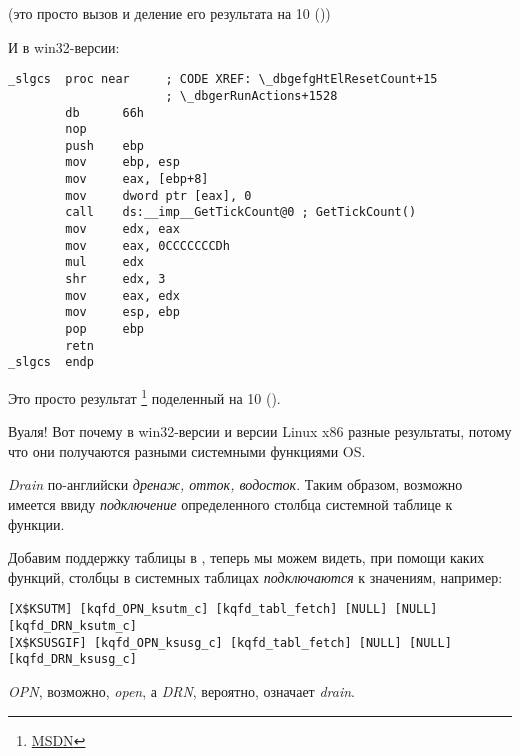 (это просто вызов  и деление его результата на 10 ())

И в win32-версии:

\begin{lstlisting}[style=customasmx86]
_slgcs  proc near     ; CODE XREF: \_dbgefgHtElResetCount+15
                      ; \_dbgerRunActions+1528
        db      66h
        nop
        push    ebp
        mov     ebp, esp
        mov     eax, [ebp+8]
        mov     dword ptr [eax], 0
        call    ds:__imp__GetTickCount@0 ; GetTickCount()
        mov     edx, eax
        mov     eax, 0CCCCCCCDh
        mul     edx
        shr     edx, 3
        mov     eax, edx
        mov     esp, ebp
        pop     ebp
        retn
_slgcs  endp
\end{lstlisting}

Это просто результат 
\footnote{\href{http://go.yurichev.com/17248}{MSDN}}
поделенный на 10 ().

Вуаля! Вот почему в win32-версии и версии Linux x86 разные результаты, потому что они получаются разными 
системными функциями \ac{OS}.

\emph{Drain} по-английски \emph{дренаж, отток, водосток}. Таким образом, возможно имеется ввиду \emph{подключение} 
определенного столбца системной таблице к функции.

Добавим поддержку таблицы  в \oracletables, 
теперь мы можем видеть, при помощи каких функций, столбцы в системных таблицах \emph{подключаются} к значениям, 
например:

\begin{lstlisting}
[X$KSUTM] [kqfd_OPN_ksutm_c] [kqfd_tabl_fetch] [NULL] [NULL] [kqfd_DRN_ksutm_c]
[X$KSUSGIF] [kqfd_OPN_ksusg_c] [kqfd_tabl_fetch] [NULL] [NULL] [kqfd_DRN_ksusg_c]
\end{lstlisting}

\emph{OPN}, возможно, \emph{open}, а \emph{DRN}, вероятно, означает \emph{drain}.

